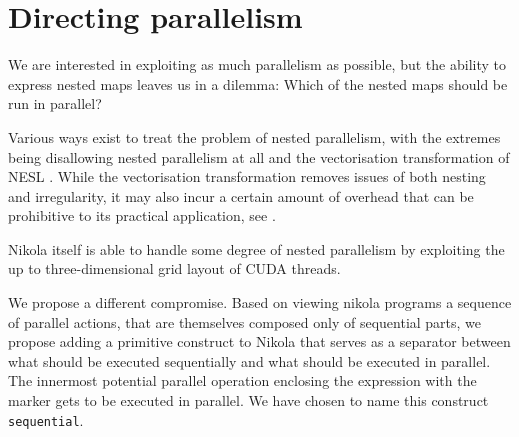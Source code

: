 \chapter{Directing parallelism}
\label{chap:directing-parallelism}









We are interested in exploiting as much parallelism as possible, but the
ability to express nested maps leaves us in a dilemma: Which of the nested maps
should be run in parallel?

Various ways exist to treat the problem of nested parallelism, with the
extremes being disallowing nested parallelism at all and the vectorisation
transformation of NESL \cite{nesl}. While the vectorisation transformation
removes issues of both nesting and irregularity, it may also incur a certain
amount of overhead that can be prohibitive to its practical application, see
\cite{Catanzaro2011}.

Nikola itself is able to handle some degree of nested parallelism by exploiting
the up to three-dimensional grid layout of CUDA threads.

We propose a different compromise. Based on viewing nikola programs a sequence
of parallel actions, that are themselves composed only of sequential parts, we
propose adding a primitive construct to Nikola that serves as a separator
between what should be executed sequentially and what should be executed in
parallel. The innermost potential parallel operation enclosing the expression
with the marker gets to be executed in parallel. We have chosen to name this
construct \texttt{sequential}.


